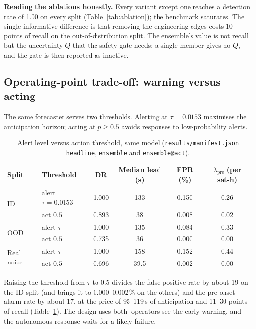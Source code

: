 \documentclass[10pt,a4paper]{article}
\newcommand{\file}[1]{\texttt{#1}}
\begin{document}
\textbf{Reading the ablations honestly.} Every variant except one reaches a detection rate of 1.00 on
every split (Table~\ref{tab:ablation}); the benchmark saturates. The single informative difference is
that removing the engineering edges costs 10 points of recall on the out-of-distribution split. The
ensemble's value is not recall but the uncertainty $Q$ that the safety gate needs; a single member
gives no $Q$, and the gate is then reported as inactive.

\subsection{Operating-point trade-off: warning versus acting}
The same forecaster serves two thresholds. Alerting at $\tau=0.0153$ maximises the anticipation
horizon; acting at $\bar p\ge 0.5$ avoids responses to low-probability alerts.

\begin{table}[ht]
\centering
\caption{Alert level versus action threshold, same model (\file{results/manifest.json}
\texttt{headline}, \texttt{ensemble} and \texttt{ensemble@act}).}
\label{tab:operating}
\small
\begin{tabular}{@{}llcccc@{}}
\toprule
Split & Threshold & DR & Median lead (s) & FPR (\%) & $\lambda_{\mathrm{pre}}$ (per sat-h) \\
\midrule
\multirow{2}{*}{ID} & alert $\tau=0.0153$ & 1.000 & 133 & 0.150 & 0.26 \\
 & act $0.5$ & 0.893 & 38 & 0.008 & 0.02 \\
\multirow{2}{*}{OOD} & alert $\tau$ & 1.000 & 135 & 0.084 & 0.33 \\
 & act $0.5$ & 0.735 & 36 & 0.000 & 0.00 \\
\multirow{2}{*}{Real noise} & alert $\tau$ & 1.000 & 158 & 0.152 & 0.44 \\
 & act $0.5$ & 0.696 & 39.5 & 0.002 & 0.00 \\
\bottomrule
\end{tabular}
\end{table}

Raising the threshold from $\tau$ to 0.5 divides the false-positive rate by about 19 on the ID split
(and brings it to 0.000--0.002\,\% on the others) and the pre-onset alarm rate by about 17, at the
price of 95--119\,s of anticipation and 11--30 points of recall (Table~\ref{tab:operating}). The design uses both: operators see the early warning, and the autonomous
response waits for a likely failure.
\end{document}
